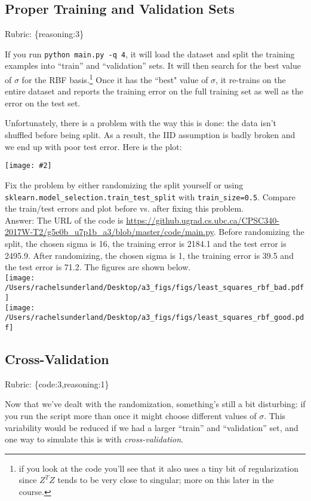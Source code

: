 \documentclass{article}
\def\rubric#1{\gre{Rubric: \{#1\}}}{}
\def\blu#1{{\color{blu}#1}}
\def\gre#1{{\color{gre}#1}}
\newcommand{\centerfig}[2]{\begin{center}\texttt{[image: \#2]}\end{center}}
\begin{document}
\subsection{Proper Training and Validation Sets}
\rubric{reasoning:3}

If you run \verb|python main.py -q 4|, it will load the dataset and split the training examples
 into ``train'' and ``validation'' sets. It will then search for the best value of $\sigma$
 for the RBF basis.\footnote{if you look at the code you'll see that it also uses a tiny bit of regularization since $Z^TZ$ tends to be very close to singular; more on this later in the course.}
  Once it has the ``best" value of $\sigma$, it re-trains on the entire dataset and reports the
  training error on the full training set as well as the error on the test set.

Unfortunately, there is a problem with the way this is done: the data isn't shuffled before being split.
As a result, the IID assumption is badly broken and we end up with poor test error. Here is the plot:

\centerfig{.7}{/Users/rachelsunderland/Desktop/a3_figs/figs/least_squares_rbf_bad.pdf}


\blu{Fix the problem by either randomizing the split yourself or using \texttt{sklearn.model\_selection.train\_test\_split} with \texttt{train\_size=0.5}. Compare the train/test errors and plot before vs. after fixing this problem.}
\textcolor{gre}{\\Answer: The URL of the code is \url{https://github.ugrad.cs.ubc.ca/CPSC340-2017W-T2/g5e0b_u7p1b_a3/blob/master/code/main.py}. Before randomizing the split, the chosen sigma is 16, the training error is 2184.1 and the test error is 2495.9. After randomizing, the chosen sigma is 1, the training error is 39.5 and the test error is 71.2.
The figures are shown below.}
\\ \texttt{[image: /Users/rachelsunderland/Desktop/a3\_figs/figs/least\_squares\_rbf\_bad.pdf]}\\
\texttt{[image: /Users/rachelsunderland/Desktop/a3\_figs/figs/least\_squares\_rbf\_good.pdf]}

\subsection{Cross-Validation}
\rubric{code:3,reasoning:1}

Now that we've dealt with the randomization, something's still a bit disturbing:
if you run the script more than once it might choose different values of $\sigma$.
This variability would be reduced if we
had a larger ``train'' and ``validation'' set, and one way to simulate this is
with \emph{cross-validation}.
\end{document}
